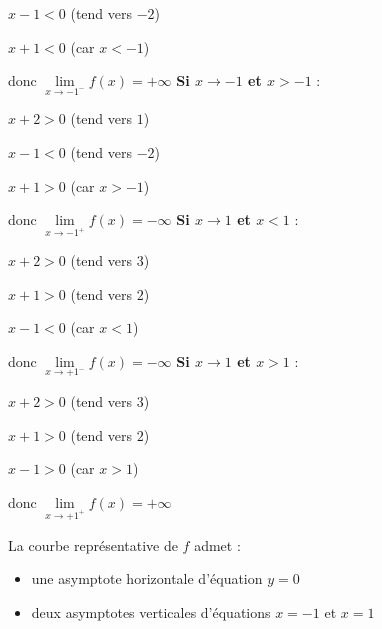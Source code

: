 \begin{corrige}
\begin{enumerate}
          \par
          $x-1 < 0$ (tend vers $-2$)
          \par
          $x+1 < 0$ (car $x < -1$)
          \par
          donc $\lim\limits_{x\rightarrow -1^-}f\left(x\right)=+\infty $
          \textbf{Si $x\rightarrow -1$ et $x > -1$} :
          \par
          $x+2 > 0$ (tend vers $1$)
          \par
          $x-1 < 0$ (tend vers $-2$)
          \par
          $x+1 > 0$ (car $x > -1$)
          \par
          donc $\lim\limits_{x\rightarrow -1^+}f\left(x\right)=-\infty $
          \textbf{Si $x\rightarrow 1$ et $x < 1$} :
          \par
          $x+2 > 0$ (tend vers $3$)
          \par
          $x+1 > 0$ (tend vers $2$)
          \par
          $x-1 < 0$ (car $x < 1$)
          \par
          donc $\lim\limits_{x\rightarrow +1^-}f\left(x\right)=-\infty $
          \textbf{Si $x\rightarrow 1$ et $x > 1$} :
          \par
          $x+2 > 0$ (tend vers $3$)
          \par
          $x+1 > 0$ (tend vers $2$)
          \par
          $x-1 > 0$ (car $x > 1$)
          \par
          donc $\lim\limits_{x\rightarrow +1^+}f\left(x\right)=+\infty $
     \end{enumerate}
     La courbe représentative de $f$ admet :
     \begin{itemize}
          \item
          une asymptote horizontale d'équation $y=0$
          \item
          deux asymptotes verticales d'équations $x=-1$ et $x=1$
     \end{itemize}
\begin{center}
 \begin{extern}%
\end{extern}
\end{center}
\end{corrige}
